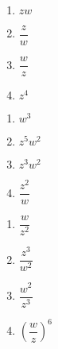 \begin{multicols}{4}

\begin{enumerate}

\setcounter{enumi}{\value{HW}}

\item $zw$  \label{polarcomparithfirst}
\item $\dfrac{z}{w}$
\item $\dfrac{w}{z}$
\item $z^{4}$ 

\setcounter{HW}{\value{enumi}}

\end{enumerate}

\end{multicols}

\begin{multicols}{4} 

\begin{enumerate}

\setcounter{enumi}{\value{HW}}

\item $w^{3}$ 
\item $z^{5}w^{2}$ 
\item $z^{3}w^{2}$ 
\item $\dfrac{z^{2}}{w}$ 

\setcounter{HW}{\value{enumi}}

\end{enumerate}

\end{multicols}

\begin{multicols}{4} 

\begin{enumerate}

\setcounter{enumi}{\value{HW}}

\item $\dfrac{w}{z^2}$ 
\item $\dfrac{z^3}{w^2}$ 
\item $\dfrac{w^2}{z^3}$ 
\item $\left(\dfrac{w}{z}\right)^6$  \label{polarcomparithlast}

\setcounter{HW}{\value{enumi}}

\end{enumerate}

\end{multicols}

